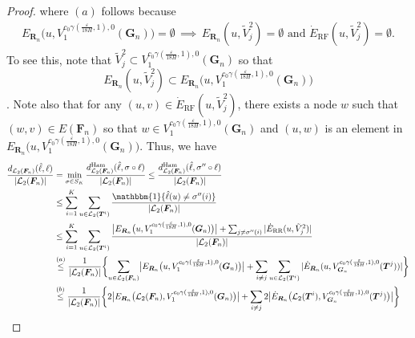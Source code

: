 \documentclass[twoside,11pt]{article}
\theoremstyle{remark}
\begin{document}
\begin{proof}
where $(a)$ follows because 
\begin{align*}
E_{\bm{R}_n}\bigl(u, V_1^{c_0 \gamma(\frac{\varepsilon}{18H}, 1), 0}(\bm{G}_n) \bigr) = \emptyset \, \implies \, E_{\bm{R}_n}(u, \tilde{V}_j^2) = \emptyset \text{ and } \dot{E}_{\text{RF}}(u, \tilde{V}_j^2) = \emptyset.
\end{align*}
To see this, note that $\tilde{V}_j^2 \subset V_1^{c_0 \gamma(\frac{\varepsilon}{18H}, 1), 0}(\bm{G}_n)$ so that 
\begin{equation*}
E_{\bm{R}_n}(u, \tilde{V}_j^2) \subset E_{\bm{R}_n}\bigl(u, V_1^{c_0 \gamma(\frac{\varepsilon}{18H}, 1), 0}(\bm{G}_n) \bigr)
\end{equation*}
. Note also that for any $(u, v) \in \dot{E}_{\text{RF}}(u, \tilde{V}_j^2)$, there exists a node $w$ such that $(w, v) \in E(\bm{F}_n)$ so that $w \in V_1^{c_0 \gamma(\frac{\varepsilon}{18H}, 1), 0}(\bm{G}_n)$ and $(u, w)$ is an element in $E_{\bm{R}_n}\bigl(u, V_1^{c_0 \gamma(\frac{\varepsilon}{18H}, 1), 0}(\bm{G}_n) \bigr)$. Thus, we have
\begingroup
\begin{align*}
\frac{d_{\mathcal{L}_2(\bm{F}_n)}(\hat{\ell}, \ell)}{|\mathcal{L}_2(\bm{F}_n)|} 
&= 
\min_{\sigma \in S_K} \frac{ d_{\mathcal{L}_2(\bm{F}_n)}^{\mathrm{Ham}}( \hat{\ell}, \sigma \circ \ell) }{|\mathcal{L}_2(\bm{F}_n)|} 
\leq
\frac{d_{\mathcal{L}_2(\bm{F}_n)}^{\mathrm{Ham}}( \hat{\ell}, \sigma'' \circ \ell) }{|\mathcal{L}_2(\bm{F}_n)|} \\
%
&\leq \sum_{i=1}^K \sum_{u \in \mathcal{L}_2(\bm{T}^i)} \frac{ \mathbbm{1}\{ \hat{\ell}(u) \neq \sigma''(i)\}}{|\mathcal{L}_2(\bm{F}_n)|} \\
%
&\leq \sum_{i=1}^K \sum_{u \in \mathcal{L}_2(\bm{T}^i)} \frac{ \bigl| E_{\bm{R}_n}\bigl(u, V_1^{c_0 \gamma(\frac{\varepsilon}{18H}, 1), 0}(\bm{G}_n) \bigr) \bigr| + \sum_{j \neq \sigma''(i)} | \dot{E}_{\text{RR}}(u, \tilde{V}_j^2) | }{ | \mathcal{L}_2(\bm{F}_n) |} \\
%
&\stackrel{(a)}{\leq} \frac{1}{| \mathcal{L}_2(\bm{F}_n)|} \biggl\{ \sum_{u \in \mathcal{L}_2(\bm{F}_n)} \bigl| E_{\bm{R}_n}\bigl(u, V_1^{c_0 \gamma(\frac{\varepsilon}{18H}, 1), 0}(\bm{G}_n) \bigr) \bigr| + \sum_{i \neq j} \sum_{u \in \mathcal{L}_2(\bm{T}^i)} | \dot{E}_{\bm{R}_n}(u, V_{\bm G_n}^{c_0 \gamma(\frac{\varepsilon}{18H}, 1), 0}(\bm{T}^j))| \biggr\}\\
%
&\stackrel{(b)}{\leq} \frac{1}{| \mathcal{L}_2(\bm{F}_n)|} \biggl\{ 2 \bigl| E_{\bm{R}_n}\bigl( \mathcal{L}_2(\bm{F}_n), V_1^{c_0 \gamma(\frac{\varepsilon}{18H}, 1), 0}(\bm{G}_n) \bigr) \bigr| + \sum_{i \neq j} 2 \bigl| \dot{E}_{\bm{R}_n}\bigl( \mathcal{L}_2(\bm{T}^i), V_{\bm G_n}^{c_0 \gamma(\frac{\varepsilon}{18H}, 1), 0}(\bm{T}^j)\bigr) \bigr| \biggr\} \\

\end{align*}
\end{proof}
\end{document}
